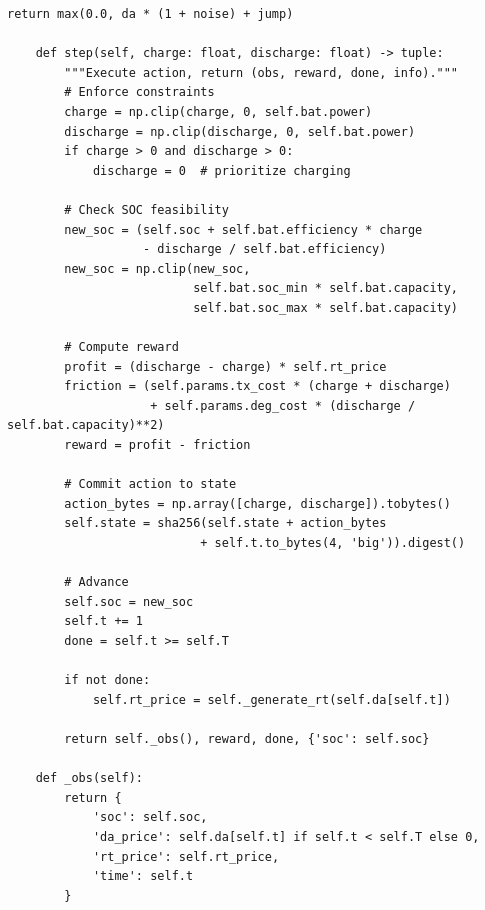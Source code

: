 \documentclass[11pt]{article}
\begin{document}
\begin{lstlisting}[style=python, caption=Level 1 Instance Generator]
        return max(0.0, da * (1 + noise) + jump)
    
    def step(self, charge: float, discharge: float) -> tuple:
        """Execute action, return (obs, reward, done, info)."""
        # Enforce constraints
        charge = np.clip(charge, 0, self.bat.power)
        discharge = np.clip(discharge, 0, self.bat.power)
        if charge > 0 and discharge > 0:
            discharge = 0  # prioritize charging
        
        # Check SOC feasibility
        new_soc = (self.soc + self.bat.efficiency * charge 
                   - discharge / self.bat.efficiency)
        new_soc = np.clip(new_soc, 
                          self.bat.soc_min * self.bat.capacity,
                          self.bat.soc_max * self.bat.capacity)
        
        # Compute reward
        profit = (discharge - charge) * self.rt_price
        friction = (self.params.tx_cost * (charge + discharge) 
                    + self.params.deg_cost * (discharge / self.bat.capacity)**2)
        reward = profit - friction
        
        # Commit action to state
        action_bytes = np.array([charge, discharge]).tobytes()
        self.state = sha256(self.state + action_bytes 
                           + self.t.to_bytes(4, 'big')).digest()
        
        # Advance
        self.soc = new_soc
        self.t += 1
        done = self.t >= self.T
        
        if not done:
            self.rt_price = self._generate_rt(self.da[self.t])
        
        return self._obs(), reward, done, {'soc': self.soc}
    
    def _obs(self):
        return {
            'soc': self.soc,
            'da_price': self.da[self.t] if self.t < self.T else 0,
            'rt_price': self.rt_price,
            'time': self.t
        }
\end{lstlisting}
\end{document}
